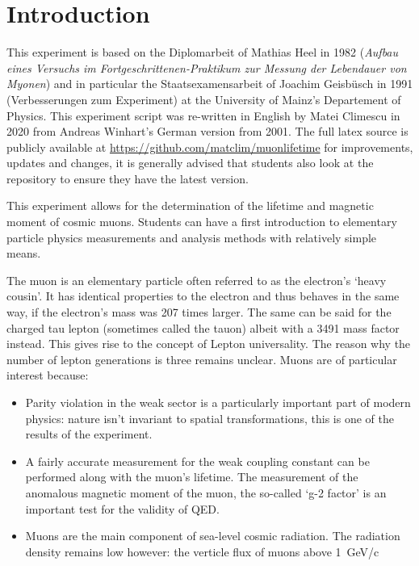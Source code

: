 
\chapter{Introduction}

This experiment is based on the Diplomarbeit of Mathias Heel in 1982 (\textit{Aufbau eines Versuchs im Fortgeschrittenen-Praktikum zur Messung der Lebendauer von Myonen}) and in particular the Staatsexamensarbeit of Joachim Geisb\"{u}sch in 1991 (Verbesserungen zum Experiment) at the University of Mainz's Departement of Physics. This experiment script was re-written in English by Matei Climescu in 2020 from Andreas Winhart's German version from 2001. The full latex source is publicly available at \href{https://github.com/matclim/muonlifetime}{https://github.com/matclim/muonlifetime} for improvements, updates and changes, it is generally advised that students also look at the repository to ensure they have the latest version.



This experiment allows for the determination of the lifetime and magnetic moment of cosmic muons. Students can have a first introduction to elementary particle physics measurements and analysis methods with relatively simple means. 


The muon \Pmuon is an elementary particle often referred to as the electron's `heavy cousin'. It has identical properties to the electron and thus behaves in the same way, if the electron's mass was 207 times larger. The same can be said for the charged tau lepton \Ptauon (sometimes called the tauon) albeit with a 3491 mass factor instead. This gives rise to the concept of Lepton universality. The reason why the number of lepton generations is three remains unclear. Muons are of particular interest because:


\begin{itemize}
\item Parity violation in the weak sector is a particularly important part of modern physics: nature isn't invariant to spatial transformations, this is one of the results of the experiment.

\item A fairly accurate measurement for the weak coupling constant can be performed along with the muon's lifetime. The measurement of the anomalous magnetic moment of the muon, the so-called `g-2 factor' is an important test for the validity of QED.

\item Muons are the main component of sea-level cosmic radiation. The radiation density remains low however: the verticle flux of muons above \SI{1}{GeV/c}
\end{itemize}

